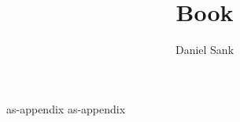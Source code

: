 \documentclass{book}
\author{Daniel Sank}
\title{Book}
\begin{document}
\maketitle

\tableofcontents


\begin{appendix}
{as-appendix}
{as-appendix}
\end{appendix}
\end{document}
